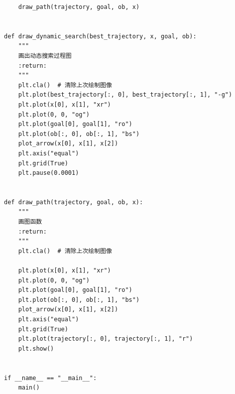 \begin{verbatim}
    draw_path(trajectory, goal, ob, x)


def draw_dynamic_search(best_trajectory, x, goal, ob):
    """
    画出动态搜索过程图
    :return:
    """
    plt.cla()  # 清除上次绘制图像
    plt.plot(best_trajectory[:, 0], best_trajectory[:, 1], "-g")
    plt.plot(x[0], x[1], "xr")
    plt.plot(0, 0, "og")
    plt.plot(goal[0], goal[1], "ro")
    plt.plot(ob[:, 0], ob[:, 1], "bs")
    plot_arrow(x[0], x[1], x[2])
    plt.axis("equal")
    plt.grid(True)
    plt.pause(0.0001)


def draw_path(trajectory, goal, ob, x):
    """
    画图函数
    :return:
    """
    plt.cla()  # 清除上次绘制图像

    plt.plot(x[0], x[1], "xr")
    plt.plot(0, 0, "og")
    plt.plot(goal[0], goal[1], "ro")
    plt.plot(ob[:, 0], ob[:, 1], "bs")
    plot_arrow(x[0], x[1], x[2])
    plt.axis("equal")
    plt.grid(True)
    plt.plot(trajectory[:, 0], trajectory[:, 1], "r")
    plt.show()


if __name__ == "__main__":
    main()
\end{verbatim}
